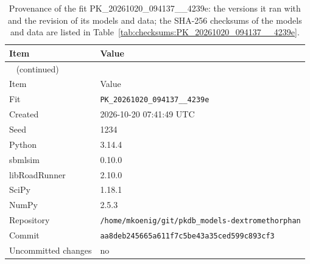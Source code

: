 \documentclass{article}
\begin{document}
\begin{longtable}{ll}
\caption{Provenance of the fit PK\_20261020\_094137\_\_4239e: the versions it ran with and the revision of its models and data; the SHA-256 checksums of the models and data are listed in Table~\ref{tab:checksums:PK_20261020_094137__4239e}.}\label{tab:provenance:PK_20261020_094137__4239e} \\
\toprule
Item & Value \\
\midrule
\endfirsthead
\multicolumn{2}{l}{\small\tablename~\thetable{} (continued)} \\
\toprule
Item & Value \\
\midrule
\endhead
\bottomrule
\endlastfoot
Fit & \texttt{PK\_20261020\_094137\_\_4239e} \\
Created & 2026-10-20 07:41:49 UTC \\
Seed & 1234 \\
Python & 3.14.4 \\
sbmlsim & 0.10.0 \\
libRoadRunner & 2.10.0 \\
SciPy & 1.18.1 \\
NumPy & 2.5.3 \\
Repository & \texttt{/home/mkoenig/git/pkdb\_models-dextromethorphan} \\
Commit & \texttt{aa8deb245665a611f7c5be43a35ced599c893cf3} \\
Uncommitted changes & no \\
\end{longtable}



\end{document}
